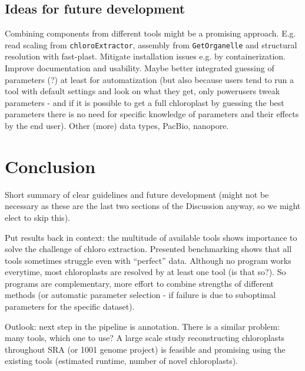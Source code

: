 \documentclass{bmcart}
\newcommand{\formatprogramnames}[1]{\texttt{#1}}
\newcommand{\ce}{\formatprogramnames{chloroExtractor}}
\newcommand{\go}{\formatprogramnames{GetOrganelle}}
\begin{document}
\subsection*{Ideas for future development}
Combining components from different tools might be a promising approach. E.g. read scaling from \ce{}, assembly from \go{} and structural resolution with fast-plast.
Mitigate installation issues e.g. by containerization.
Improve documentation and usability.
Maybe better integrated guessing of parameters (?) at least for automatization (but also because users tend to run a tool with default settings and look on what they get, only powerusers tweak parameters - and if it is possible to get a full chloroplast by guessing the best parameters there is no need for specific knowledge of parameters and their effects by the end user).
Other (more) data types, PacBio, nanopore.

\section*{Conclusion}
Short summary of clear guidelines and future development (might not be necessary as these are the last two sections of the Discussion anyway, so we might elect to skip this).

Put results back in context: the multitude of available tools shows importance to solve the challenge of chloro extraction. Presented benchmarking shows that all tools sometimes struggle even with ``perfect'' data. Although no program works everytime, most chloroplasts are resolved by at least one tool (is that so?). So programs are complementary, more effort to combine strengths of different methods (or automatic parameter selection - if failure is due to suboptimal parameters for the specific dataset).

Outlook: next step in the pipeline is annotation. There is a similar problem: many tools, which one to use? 
A large scale study reconstructing chloroplasts throughout SRA (or 1001 genome project) is feasible and promising using the existing tools (estimated runtime, number of novel chloroplasts).

\end{document}

